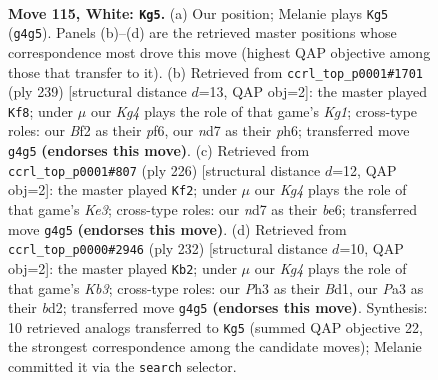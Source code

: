 \documentclass[11pt]{article}
\begin{document}
\clearpage

\begin{figure}[p]\centering
\begin{subfigure}{0.46\textwidth}\centering
\resizebox{\linewidth}{!}{%
\newchessgame
\chessboard[
  setfen={7k/3n4/8/5P2/p5K1/P6P/5B2/8 w - - 49 115},
  showmover=false,
  pgfstyle=straightmove, color=movearrow, markmove={g4-g5}
]}
\caption{}
\end{subfigure}\hfill
\begin{subfigure}{0.46\textwidth}\centering
\resizebox{\linewidth}{!}{%
\newchessgame
\chessboard[
  setfen={6k1/5p1p/5P1P/8/2K5/5p2/5B2/8 b - - 69 120},
  showmover=false,
  pgfstyle=straightmove, color=movearrow, markmove={g8-f8}
]}
\caption{}
\end{subfigure}
\\[4pt]
\begin{subfigure}{0.46\textwidth}\centering
\resizebox{\linewidth}{!}{%
\newchessgame
\chessboard[
  setfen={8/8/4b2k/8/4P3/2B1KP2/8/8 w - - 51 114},
  showmover=false,
  pgfstyle=straightmove, color=movearrow, markmove={e3-f2}
]}
\caption{}
\end{subfigure}\hfill
\begin{subfigure}{0.46\textwidth}\centering
\resizebox{\linewidth}{!}{%
\newchessgame
\chessboard[
  setfen={8/k7/8/8/7p/PK5P/3b2P1/3B4 w - - 67 117},
  showmover=false,
  pgfstyle=straightmove, color=movearrow, markmove={b3-b2}
]}
\caption{}
\end{subfigure}
\caption{\textbf{Move 115, White: \texttt{Kg5}.} (a) Our position; Melanie plays \texttt{Kg5} (\texttt{g4g5}). Panels (b)--(d) are the retrieved master positions whose correspondence most drove this move (highest QAP objective among those that transfer to it). (b) Retrieved from \texttt{ccrl\_top\_p0001\#1701} (ply 239) [structural distance $d$=13, QAP obj=2]: the master played \texttt{Kf8}; under $\mu$ our \emph{Kg4} plays the role of that game's \emph{Kg1}; cross-type roles: our \emph{B}f2 as their \emph{p}f6, our \emph{n}d7 as their \emph{p}h6; transferred move \texttt{g4g5} \textbf{(endorses this move)}. (c) Retrieved from \texttt{ccrl\_top\_p0001\#807} (ply 226) [structural distance $d$=12, QAP obj=2]: the master played \texttt{Kf2}; under $\mu$ our \emph{Kg4} plays the role of that game's \emph{Ke3}; cross-type roles: our \emph{n}d7 as their \emph{b}e6; transferred move \texttt{g4g5} \textbf{(endorses this move)}. (d) Retrieved from \texttt{ccrl\_top\_p0000\#2946} (ply 232) [structural distance $d$=10, QAP obj=2]: the master played \texttt{Kb2}; under $\mu$ our \emph{Kg4} plays the role of that game's \emph{Kb3}; cross-type roles: our \emph{P}h3 as their \emph{B}d1, our \emph{P}a3 as their \emph{b}d2; transferred move \texttt{g4g5} \textbf{(endorses this move)}. Synthesis: 10 retrieved analogs transferred to \texttt{Kg5} (summed QAP objective 22, the strongest correspondence among the candidate moves); Melanie committed it via the \texttt{search} selector.}
\label{fig:thought-m228}
\end{figure}
\end{document}
